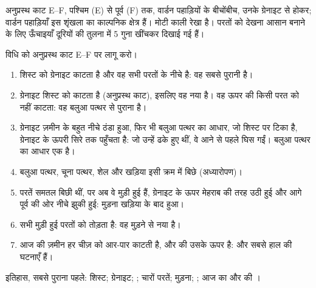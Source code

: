 \begin{omfigure}
\smallskip
{\small अनुप्रस्थ काट E--F, पश्चिम (E) से पूर्व (F) तक, वार्डन पहाड़ियों के बीचोंबीच,
उनके ग्रेनाइट से होकर; वार्डन पहाड़ियाँ इस शृंखला का काल्पनिक क्षेत्र हैं। मोटी काली
रेखा  है। परतों को देखना आसान बनाने के लिए ऊँचाइयाँ दूरियों की तुलना में 5 गुना
खींचकर दिखाई गई हैं।}
\label{fig:g7:geological-time:section}
\end{omfigure}

\begin{example}[वार्डन पहाड़ियों का इतिहास]\label{ex:g7:geological-time:varden}
विधि को अनुप्रस्थ काट E--F पर लागू करो।
\begin{enumerate}
  \item शिस्ट को ग्रेनाइट काटता है और वह सभी परतों के नीचे है: वह सबसे पुरानी
         है।
  \item ग्रेनाइट शिस्ट को काटता है (अनुप्रस्थ काट), इसलिए वह नया है। वह ऊपर की
        किसी परत को नहीं काटता: वह बलुआ पत्थर से
        पुराना है।
  \item ग्रेनाइट ज़मीन के बहुत नीचे ठंडा हुआ, फिर भी बलुआ पत्थर का आधार, जो शिस्ट
        पर टिका है, ग्रेनाइट के ऊपरी सिरे तक पहुँचता है: जो  उन्हें ढके हुए
        थीं, वे  आने से पहले घिस गईं। बलुआ पत्थर का आधार एक 
        है।
  \item बलुआ पत्थर, चूना पत्थर, शेल और खड़िया इसी क्रम में बिछे
        (अध्यारोपण)।
  \item परतें समतल बिछी थीं, पर अब वे मुड़ी हुई हैं, ग्रेनाइट के ऊपर मेहराब की तरह
        उठी हुई और आगे पूर्व की ओर नीचे झुकी हुई: मुड़ना खड़िया के
        बाद हुआ।
  \item {} सभी मुड़ी हुई परतों को तोड़ता है: वह मुड़ने से
        नया है।
  \item आज की ज़मीन हर चीज़ को आर-पार काटती है, और  की  उसके ऊपर है: 
        और  सबसे हाल की घटनाएँ हैं।
\end{enumerate}
इतिहास, सबसे पुराना पहले: शिस्ट; ग्रेनाइट; ; चारों परतें; मुड़ना; ; आज का
 और  की ।
\end{example}


